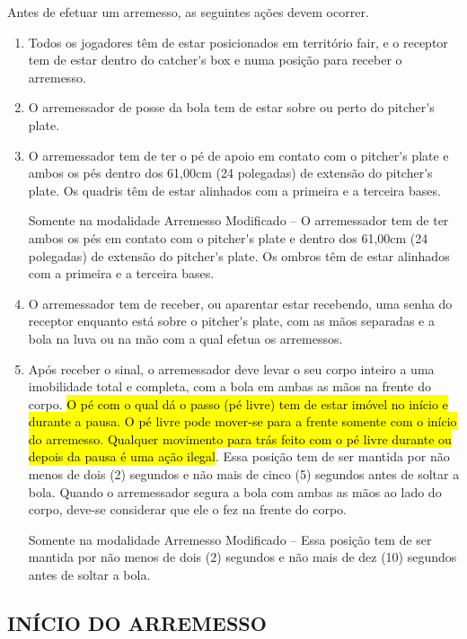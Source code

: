 Antes de efetuar um arremesso, as seguintes ações devem ocorrer.
\begin{enumerate}[label=(\alph*)]
	\item Todos os jogadores têm de estar posicionados em território \gls{fair}, e o receptor  tem de estar dentro do \gls{catcher's box} e numa posição para receber o arremesso.
	\item   O arremessador de posse da bola tem de estar sobre ou perto do \gls{pitcher's plate}.
	\item   O arremessador tem de ter o pé de apoio em contato com o \gls{pitcher's plate} e ambos os pés dentro dos 61,00cm (24 polegadas) de extensão do \gls{pitcher's plate}. Os quadris têm de estar alinhados com a primeira e a terceira bases.

	Somente na modalidade Arremesso Modificado -- O arremessador tem de ter ambos os pés em contato com o \gls{pitcher's plate} e dentro dos 61,00cm (24 polegadas) de extensão do \gls{pitcher's plate}. Os ombros têm de estar alinhados com a primeira e a terceira bases.

	\item  O arremessador tem de receber, ou aparentar estar recebendo, uma senha  do receptor enquanto está sobre o \gls{pitcher's plate}, com as mãos separadas e a  bola na luva ou na mão com a qual efetua os arremessos.

	\item  Após receber o sinal, o arremessador deve levar o seu corpo inteiro a uma  imobilidade total e completa, com a bola em ambas as mãos na frente do corpo. \hl{	 O p\'e com o qual d\'a o passo (p\'e livre) tem de estar im\'ovel no in\'icio e durante a pausa. O p\'e livre pode mover-se para a frente somente com o in\'icio do arremesso. Qualquer movimento para tr\'as feito com o p\'e livre durante ou depois da pausa \'e uma a\c{c}\~ao ilegal}. Essa posi\c{c}\~ao tem de ser mantida por n\~ao menos de dois (2) segundos e n\~ao mais de cinco (5) segundos antes de soltar a  bola. Quando o arremessador segura a bola com ambas as m\~aos ao lado do corpo, deve-se considerar que ele o fez na frente do corpo.

	Somente na modalidade Arremesso Modificado -- Essa posição tem de ser mantida por não menos de dois (2) segundos e não mais de dez (10) segundos antes de soltar a bola.
\end{enumerate}

\subsection{INÍCIO DO ARREMESSO}

